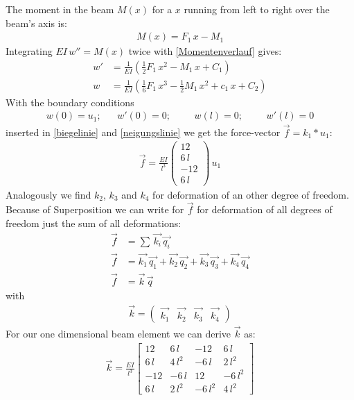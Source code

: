   The moment in the beam $M(x)$ for a $x$ running from left to right over the beam's axis is:
  \begin{align}
  M(x)=F_1\,x- M_1 \label{Momentenverlauf}
  \end{align}
  Integrating $EI\,w''=M(x)$ twice with \ref{Momentenverlauf} gives:
  \begin{align}
  w'&=\frac{1}{EI}\left(\frac{1}{2}F_1\,x^2-M_1\,x+C_1\right) \label{neigungslinie}\\
  w&=\frac{1}{EI}\left(\frac{1}{6}F_1\,x^3-\frac{1}{2}M_1\,x^2+c_1\,x+C_2\right) \label{biegelinie}
  \end{align}
  With the boundary conditions
  \begin{align}
  w(0)=u_1; && w'(0)=0; &&& w(l)=0; &&& w'(l)=0 \nonumber
  \end{align}
  inserted in \ref{biegelinie} and \ref{neigungslinie} we get the force-vector $\vec{f}=k_1*u_1$:
  \begin{align}
  \vec{f}=\frac{EI}{l^3}\left(\begin{array}{c}
  12 \\ 
  6\,l \\ 
  -12 \\ 
  6\,l
  \end{array} \right)\,u_1
  \end{align}
  Analogously we find $k_2$, $k_3$ and $k_4$ for deformation of an other degree of freedom. Because of Superposition we can write for $\vec{f}$ for deformation of all degrees of freedom just the sum of all deformations:
  \begin{align}
  \vec{f}&=\sum\,\vec{k_i}\,\vec{q_i} \nonumber \\
  \vec{f}&=\vec{k_1}\,\vec{q_1}+\vec{k_2}\,\vec{q_2}+\vec{k_3}\,\vec{q_3}+\vec{k_4}\,\vec{q_4} \nonumber \\
  \vec{f}&=\vec{k}\,\vec{q} \label{grundgleichung}
  \end{align}
  with
  \begin{align}
  \vec{k}=\left(\begin{array}{cccc}
  \vec{k_1} & \vec{k_2} & \vec{k_3} & \vec{k_4}
  \end{array} \right) \label{k-matrix}
  \end{align}
  For our one dimensional beam element we can derive $\vec{k}$ as:
  \begin{align}
  \vec{k}=\frac{EI}{l^3}\left[\begin{array}{cccc}
  12 & 6\,l & -12 & 6\,l \\ 
  6\,l & 4\,l^2 & -6\,l & 2\,l^2 \\ 
  -12 & -6 \,l & 12 & -6\,l^2 \\ 
  6\,l & 2\,l^2 & -6\,l^2 & 4\,l^2
  \end{array} \right] \label{beam-k-matrix}
  \end{align}
  \bigskip
  
